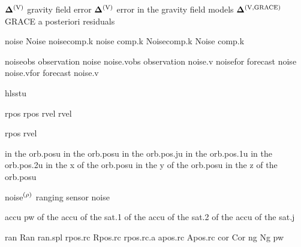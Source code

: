 \begin{acronym}[---------------]
    {${\bm\Delta}^{\rm\left(V\right)}$}        {gravity field error}
                                {${\bm\Delta}^{\rm\left(V\right)}$}        {error in the gravity field models}
    {${\bm\Delta}^{\rm\left(V,GRACE\right)}$}  {\acs{GRACE} a posteriori residuals}


						{\acs{noise}}							{Noise}
			{\acs{noise}\acs{comp.k}}	{\acl{noise} \acl{comp.k}}
			{\acs{Noise}\acs{comp.k}}	{\acl{Noise} \acl{comp.k}}

				{\acs{noise}\acs{obs}}		{observation \acl{noise}} 	%
			{\acs{noise.v}\acs{obs}}	{observation \acl{noise.v}}	%
				{\acs{noise}\acs{for}}		{forecast \acl{noise}}		%
			{\acs{noise.v}\acs{for}}	{forecast \acl{noise.v}}	%

				{hlsstu}

						{rpos}
					{rpos}
						{rvel}
					{rvel}

				{rpos}
				{rvel}

						{ in the }		{orb.posu}
					{ in the }		{orb.posu}
					{ in the }		{orb.pos.ju}
					{ in the }		{orb.pos.1u}
					{ in the }		{orb.pos.2u}
						{ in the }		{x}				{ of the }		{orb.posu}
						{ in the }		{y}				{ of the }		{orb.posu}
						{ in the }		{z}				{ of the }		{orb.posu}

			{\acs{noise}$^{\rm {\left(\rho\right)}}$}	{ranging sensor \acl{noise}}

					{accu}
		{pw}
					{ of the } 		{accu}		{ of the } 		{sat.1}
					{ of the } 		{accu}		{ of the } 		{sat.2}
					{ of the } 		{accu}		{ of the } 		{sat.j}

						{ran}
						{Ran}
						{ran.spl}
						{rpos.rc}
						{Rpos.rc}
						{rpos.rc.a}
						{apos.rc}
						{Apos.rc}
						{cor}
						{Cor}
						{ng}
						{Ng}
				{pw}


\end{acronym}
